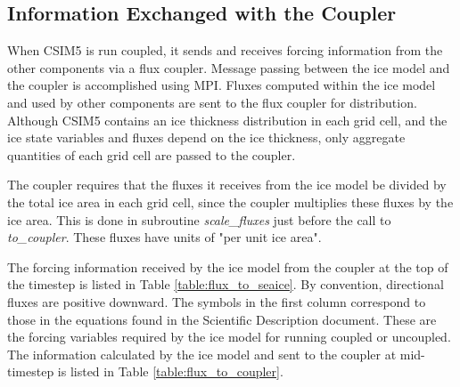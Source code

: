 
\subsection {Information Exchanged with the Coupler}

When CSIM5 is run coupled, it sends and receives forcing information from the other
components via a flux coupler.  Message passing between the ice model and
the coupler is accomplished using MPI.  Fluxes computed within the ice 
model and used by other components are sent to the flux coupler for distribution.
Although CSIM5 contains an ice thickness distribution in each grid cell,
and the ice state variables and fluxes depend on the ice thickness, only
aggregate quantities of each grid cell are passed to the coupler.

The coupler requires that the fluxes it receives from the ice model be 
divided by the total ice area in each grid cell, since the coupler multiplies
these fluxes by the ice area.  This is done in subroutine {\it scale\_fluxes}
just before the call to {\it to\_coupler}.  These fluxes have units of
"per unit ice area".

The forcing information received by the ice model from the coupler at the
top of the timestep is listed in Table \ref{table:flux_to_seaice}. By convention,
directional fluxes are positive downward.  The symbols in the first column 
correspond to those in the equations found in the Scientific Description 
document.  These are the forcing variables required by the ice model for running
coupled or uncoupled.  The information calculated by the ice model and sent to
the coupler at mid-timestep is listed in Table \ref{table:flux_to_coupler}.

